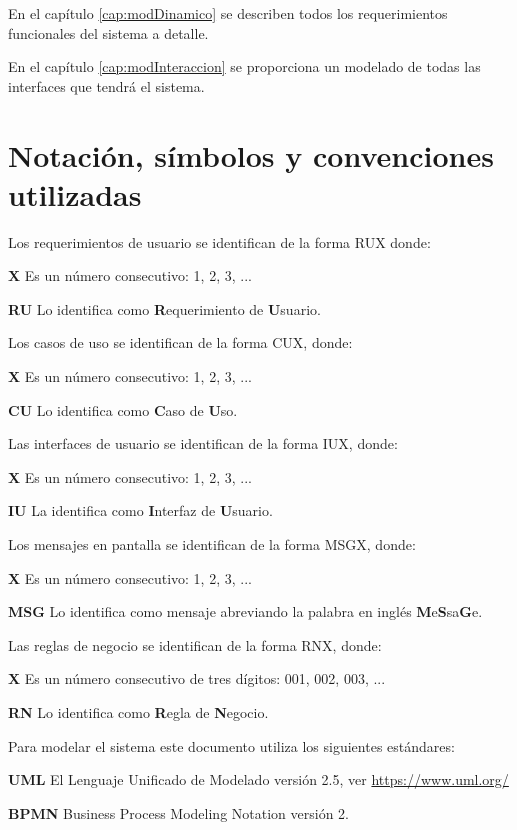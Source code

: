 En el capítulo \ref{cap:modDinamico} se describen todos los requerimientos funcionales del sistema a detalle.

En el capítulo \ref{cap:modInteraccion} se proporciona un modelado de todas las interfaces que tendrá el sistema.

\section{Notación, símbolos y convenciones utilizadas}


Los requerimientos de usuario se identifican de la forma RUX donde:

\textbf{X} Es un número consecutivo: 1, 2, 3, ...

\textbf{RU} Lo identifica como \textbf{R}equerimiento de \textbf{U}suario.


Los casos de uso se identifican de la forma CUX, donde:

\textbf{X} Es un número consecutivo: 1, 2, 3, ...

\textbf{CU} Lo identifica como \textbf{C}aso de \textbf{U}so.

Las interfaces de usuario se identifican de la forma IUX, donde:

\textbf{X} Es un número consecutivo: 1, 2, 3, ...

\textbf{IU} La identifica como \textbf{I}nterfaz de \textbf{U}suario.

Los mensajes en pantalla se identifican de la forma MSGX, donde:

\textbf{X} Es un número consecutivo: 1, 2, 3, ...

\textbf{MSG} Lo identifica como mensaje abreviando la palabra en inglés \textbf{M}e\textbf{S}sa\textbf{G}e.

Las reglas de negocio se identifican de la forma RNX, donde:

\textbf{X} Es un número consecutivo de tres dígitos: 001, 002, 003, ...

\textbf{RN} Lo identifica como \textbf{R}egla de \textbf{N}egocio.


Para modelar el sistema este documento utiliza los siguientes estándares:

\textbf{UML} El Lenguaje Unificado de Modelado versión 2.5, ver \url{https://www.uml.org/}

\textbf{BPMN} Business Process Modeling Notation versión 2.
